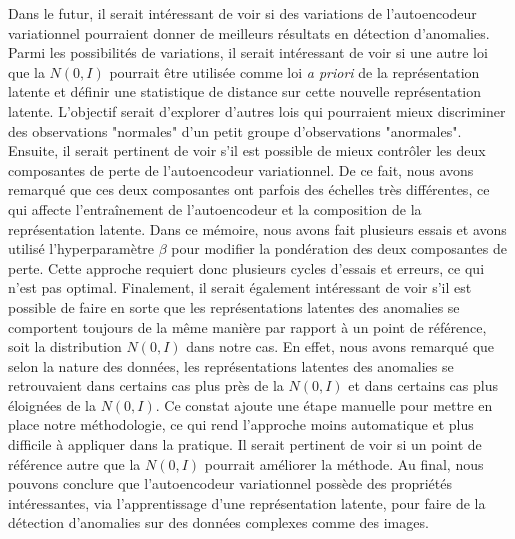 Dans le futur, il serait intéressant de voir si des variations de l'autoencodeur variationnel pourraient donner de meilleurs résultats en détection d'anomalies. Parmi les possibilités de variations, il serait intéressant de voir si une autre loi que la $N(0,I)$ pourrait être utilisée comme loi \textit{a priori} de la représentation latente et définir une statistique de distance sur cette nouvelle représentation latente. L'objectif serait d'explorer d'autres lois qui pourraient mieux discriminer des observations "normales" d'un petit groupe d'observations "anormales". Ensuite, il serait pertinent de voir s'il est possible de mieux contrôler les deux composantes de perte de l'autoencodeur variationnel. De ce fait, nous avons remarqué que ces deux composantes ont parfois des échelles très différentes, ce qui affecte l'entraînement de l'autoencodeur et la composition de la représentation latente. Dans ce mémoire, nous avons fait plusieurs essais et avons utilisé l'hyperparamètre $\beta$  pour modifier la pondération des deux composantes de perte. Cette approche requiert donc plusieurs cycles d'essais et erreurs, ce qui n'est pas optimal. Finalement, il serait également intéressant de voir s'il est possible de faire en sorte que les représentations latentes des anomalies se comportent toujours de la même manière par rapport à un point de référence, soit la distribution $N(0,I)$ dans notre cas. En effet, nous avons remarqué que selon la nature des données, les représentations latentes des anomalies se retrouvaient dans certains cas plus près de la $N(0,I)$ et dans certains cas  plus éloignées de la $N(0,I)$. Ce constat ajoute une étape manuelle pour mettre en place notre méthodologie, ce qui rend l'approche moins automatique et plus difficile à appliquer dans la pratique. Il serait pertinent de voir si un point de référence autre que la $N(0,I)$ pourrait améliorer la méthode. Au final, nous pouvons conclure que l'autoencodeur variationnel possède des propriétés intéressantes, via l'apprentissage d'une représentation latente, pour faire de la détection d'anomalies sur des données complexes comme des images.


